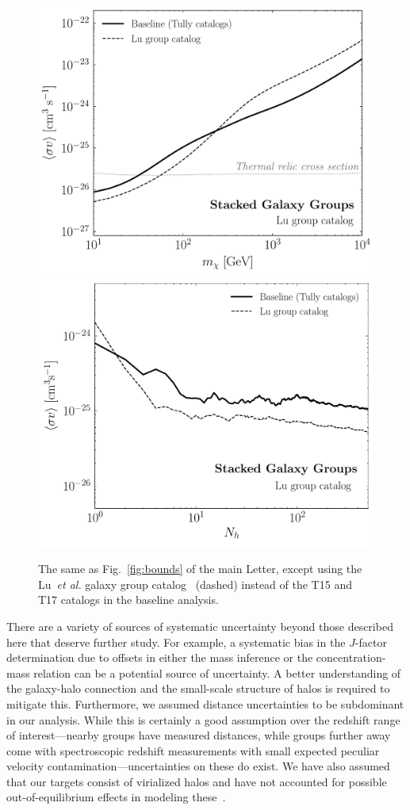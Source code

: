 \begin{figure}[t]
  \centering
  \includegraphics[width=.45\textwidth]{ch-clusters/plots/systematics_lu.pdf}
   \includegraphics[width=.45\textwidth]{ch-clusters/plots/systematics_lu_elephant.pdf} 
  \caption{The same as Fig.~\ref{fig:bounds} of the main Letter, except using the Lu~\emph{et al.} galaxy group catalog~\cite{Lu:2016vmu} (dashed) instead of the T15 and T17 catalogs in the baseline analysis. }
  \label{fig:lucatalog}
\end{figure}

\noindent There are a variety of sources of systematic uncertainty beyond those described here that  deserve further study.  For example, a systematic bias in the $J$-factor determination due to offsets in either the mass inference or the concentration-mass relation can be a potential source of uncertainty. A better understanding of the galaxy-halo connection and the small-scale structure of halos is required to mitigate this. Furthermore, we assumed distance uncertainties to be subdominant in our analysis. While this is certainly a good assumption over the redshift range of interest---nearby groups have measured distances, while groups further away come with spectroscopic redshift measurements with small expected peculiar velocity contamination---uncertainties on these do exist. We have also assumed that our targets consist of virialized halos and have not accounted for possible out-of-equilibrium effects in modeling these~\cite{1993AJ....105.2035D}.